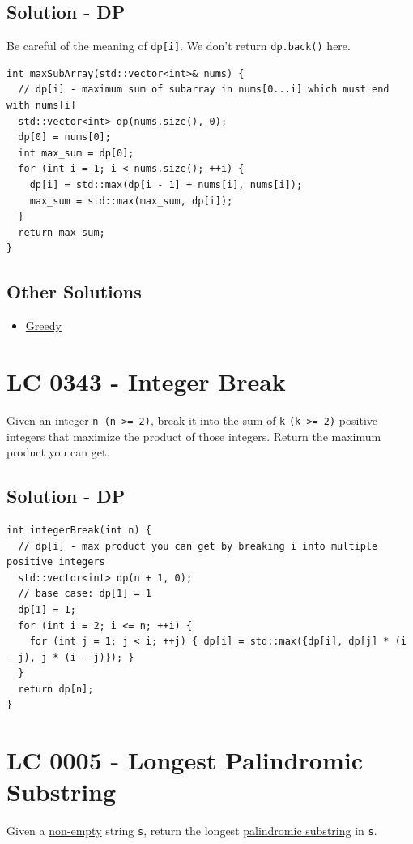 \subsection*{Solution - DP}\label{solution:lc0053_dp}
Be careful of the meaning of {\colorbox{CodeBackground}{\lstinline|dp[i]|}}. We don't return {\colorbox{CodeBackground}{\lstinline|dp.back()|}} here.
\begin{lstlisting}
int maxSubArray(std::vector<int>& nums) {
  // dp[i] - maximum sum of subarray in nums[0...i] which must end with nums[i]
  std::vector<int> dp(nums.size(), 0);
  dp[0] = nums[0];
  int max_sum = dp[0];
  for (int i = 1; i < nums.size(); ++i) {
    dp[i] = std::max(dp[i - 1] + nums[i], nums[i]);
    max_sum = std::max(max_sum, dp[i]);
  }
  return max_sum;
}
\end{lstlisting}

\subsection*{Other Solutions}
\begin{itemize}
\item \hyperref[solution:lc0053_greedy]{Greedy}
\end{itemize}

\section{LC 0343 - Integer Break}
Given an integer {\colorbox{CodeBackground}{\lstinline|n (n >= 2)|}}, break it into the sum of {\colorbox{CodeBackground}{\lstinline|k|}} {\colorbox{CodeBackground}{\lstinline|(k >= 2)|}} positive integers that maximize the product of those integers. Return the maximum product you can get.

\subsection*{Solution - DP}
\begin{lstlisting}
int integerBreak(int n) {
  // dp[i] - max product you can get by breaking i into multiple positive integers
  std::vector<int> dp(n + 1, 0);
  // base case: dp[1] = 1
  dp[1] = 1;
  for (int i = 2; i <= n; ++i) {
    for (int j = 1; j < i; ++j) { dp[i] = std::max({dp[i], dp[j] * (i - j), j * (i - j)}); }
  }
  return dp[n];
}
\end{lstlisting}

\section{LC 0005 - Longest Palindromic Substring}
Given a \ul{non-empty} string {\colorbox{CodeBackground}{\lstinline|s|}}, return the longest \ul{palindromic substring} in {\colorbox{CodeBackground}{\lstinline|s|}}.\\

